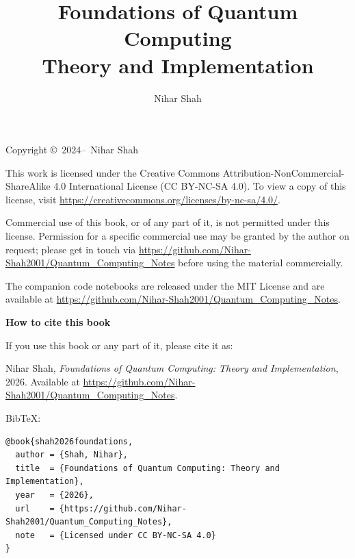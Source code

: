 \title{\vspace{-3.0cm}Foundations of Quantum Computing\\[0.5em]
  \large Theory and Implementation}  %
\author{Nihar Shah}  %
\date{}  %
\maketitle  %

\thispagestyle{empty}
\vspace*{\fill}
\noindent Copyright \copyright\ 2024--\the\year\ Nihar Shah

\medskip
\noindent This work is licensed under the Creative Commons
Attribution-NonCommercial-ShareAlike 4.0 International License (CC BY-NC-SA 4.0).
To view a copy of this license, visit
\url{https://creativecommons.org/licenses/by-nc-sa/4.0/}.

\medskip
\noindent Commercial use of this book, or of any part of it, is not permitted under this license.
Permission for a specific commercial use may be granted by the author on request; please get in touch via
\url{https://github.com/Nihar-Shah2001/Quantum_Computing_Notes} before using the material commercially.

\medskip
\noindent The companion code notebooks are released under the MIT License and are available at
\url{https://github.com/Nihar-Shah2001/Quantum_Computing_Notes}.

\bigskip
\noindent\textbf{How to cite this book}

\medskip
\noindent If you use this book or any part of it, please cite it as:

\medskip
\noindent Nihar Shah, \textit{Foundations of Quantum Computing: Theory and Implementation}, 2026.
Available at \url{https://github.com/Nihar-Shah2001/Quantum_Computing_Notes}.

\medskip
\noindent BibTeX:
{\small
\begin{verbatim}
@book{shah2026foundations,
  author = {Shah, Nihar},
  title  = {Foundations of Quantum Computing: Theory and Implementation},
  year   = {2026},
  url    = {https://github.com/Nihar-Shah2001/Quantum_Computing_Notes},
  note   = {Licensed under CC BY-NC-SA 4.0}
}
\end{verbatim}
}
\clearpage
